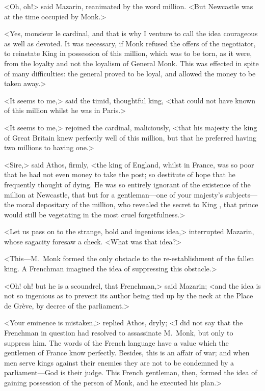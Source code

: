 <Oh, oh!> said Mazarin, reanimated by the word million. <But Newcastle was at the time occupied by Monk.>

<Yes, monsieur le cardinal, and that is why I venture to call the idea courageous as well as devoted. It was necessary, if Monk refused the offers of the negotiator, to reinstate King  in possession of this million, which was to be torn, as it were, from the loyalty and not the loyalism of General Monk. This was effected in spite of many difficulties: the general proved to be loyal, and allowed the money to be taken away.>

<It seems to me,> said the timid, thoughtful king, <that  could not have known of this million whilst he was in Paris.>

<It seems to me,> rejoined the cardinal, maliciously, <that his majesty the king of Great Britain knew perfectly well of this million, but that he preferred having two millions to having one.>

<Sire,> said Athos, firmly, <the king of England, whilst in France, was so poor that he had not even money to take the post; so destitute of hope that he frequently thought of dying. He was so entirely ignorant of the existence of the million at Newcastle, that but for a gentleman—one of your majesty's subjects—the moral depositary of the million, who revealed the secret to King , that prince would still be vegetating in the most cruel forgetfulness.>

<Let us pass on to the strange, bold and ingenious idea,> interrupted Mazarin, whose sagacity foresaw a check. <What was that idea?>

<This—M.~Monk formed the only obstacle to the re-establishment of the fallen king. A Frenchman imagined the idea of suppressing this obstacle.>

<Oh! oh! but he is a scoundrel, that Frenchman,> said Mazarin; <and the idea is not so ingenious as to prevent its author being tied up by the neck at the Place de Grève, by decree of the parliament.>

<Your eminence is mistaken,> replied Athos, dryly; <I did not say that the Frenchman in question had resolved to assassinate M.~Monk, but only to suppress him. The words of the French language have a value which the gentlemen of France know perfectly. Besides, this is an affair of war; and when men serve kings against their enemies they are not to be condemned by a parliament—God is their judge. This French gentleman, then, formed the idea of gaining possession of the person of Monk, and he executed his plan.>

